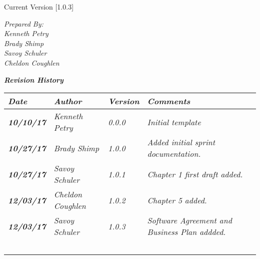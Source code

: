 


Current Version [1.0.3]
\vspace*{5mm}

{\color{SDColor5}
\noindent
\textit{Prepared By:}\\
\textit{Kenneth Petry}\\
\textit{Brady Shimp}\\
\textit{Savoy Schuler}\\
\textit{Cheldon Coughlen}
}

\vfill
\noindent
{\color{SDColor3} \textit{\textbf{Revision History}}}\\
\begin{tabular}{|>{\raggedright}p{1.5cm}|>{\raggedright}p{3cm}|>{\raggedright}p{1.5cm}|>{\raggedright}p{9cm}|}
\hline
\textit{\textbf{Date}} &  \textit{\textbf{Author}} & \textit{\textbf{Version}} & \textit{\textbf{Comments}}\tabularnewline
\hline
 \textit{\textbf{10/10/17}} & \textit{Kenneth Petry} & \textit{0.0.0} & \textit{Initial template}\tabularnewline\hline
  \textit{\textbf{10/27/17}} & \textit{Brady Shimp} & \textit{1.0.0} & \textit{Added initial sprint documentation.}\tabularnewline\hline
\textit{\textbf{10/27/17}} & \textit{Savoy Schuler} & \textit{1.0.1} & \textit{Chapter 1 first draft added.}\tabularnewline\hline
\textit{\textbf{12/03/17}} & \textit{Cheldon Coughlen} & \textit{1.0.2} & \textit{Chapter 5 added.}\tabularnewline\hline
\textit{\textbf{12/03/17}} & \textit{Savoy Schuler} & \textit{1.0.3} & \textit{Software Agreement and Business Plan addded.}\tabularnewline
\hline
 &  &  & \tabularnewline
 \hline
 &  &  & \tabularnewline
\hline
 &  &  & \tabularnewline
\hline
 &  &  & \tabularnewline
\hline
 &  &  & \tabularnewline
\hline
\end{tabular}
\vfill


